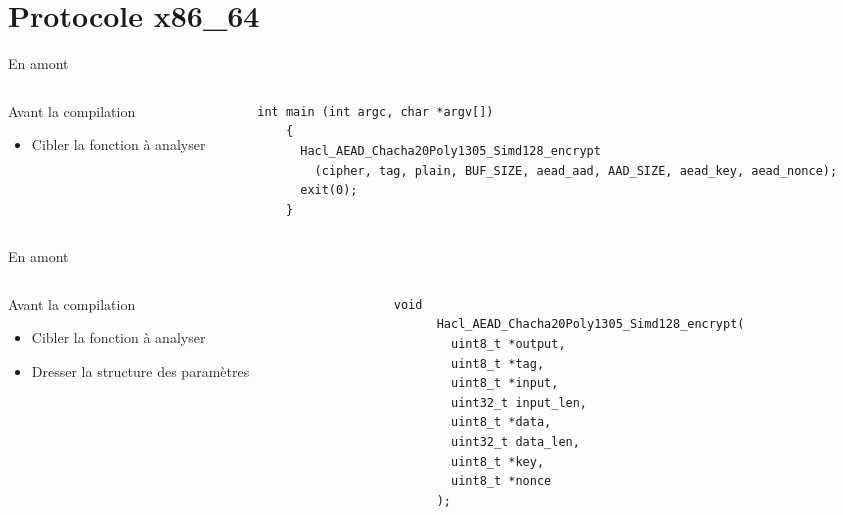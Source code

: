 \documentclass[A4,svgnames,9pt,aspectratio=169]{beamer}
\begin{document}

\section{Protocole x86\_64}
\frame{\sectionpage}


\begin{frame}[fragile]{En amont}

  \begin{columns}
  \begin{column}{0.3\textwidth}
    \begin{block}{Avant la compilation}
      \begin{itemize}
        \item Cibler la fonction à analyser
      \end{itemize}
    \end{block}      
  \end{column}


  \begin{column}{0.7\textwidth}
  \begin{lstlisting}[style=CStyle, caption={chacha20Poly1305-128-binsec-test.c}, gobble=4]
    int main (int argc, char *argv[])
    {
      Hacl_AEAD_Chacha20Poly1305_Simd128_encrypt
        (cipher, tag, plain, BUF_SIZE, aead_aad, AAD_SIZE, aead_key, aead_nonce);
      exit(0);
    }
  \end{lstlisting}
  \end{column}
  \end{columns}
\end{frame}
\begin{frame}{En amont}

  \begin{columns}
  \begin{column}{0.3\textwidth}
    \begin{block}{Avant la compilation}
      \begin{itemize}
        \item Cibler la fonction à analyser
        \item Dresser la structure des paramètres
      \end{itemize}
    \end{block}      
  \end{column}


  \begin{column}{0.7\textwidth}
    \begin{lstlisting}[style=CStyle, caption={Hacl\_AEAD\_Chacha20Poly1305\_Simd128\_encrypt.h}, gobble=6]
      void
      Hacl_AEAD_Chacha20Poly1305_Simd128_encrypt(
        uint8_t *output,
        uint8_t *tag,
        uint8_t *input,
        uint32_t input_len,
        uint8_t *data,
        uint32_t data_len,
        uint8_t *key,
        uint8_t *nonce
      );
    \end{lstlisting}
  \end{column}
  \end{columns}
\end{frame}
\end{document}
